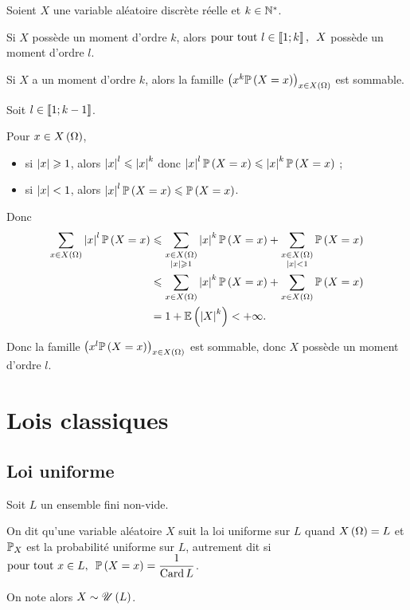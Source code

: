 \begin{prop}
Soient \(X\) une variable aléatoire discrète réelle et \(k\in\mathbb{N}^*\).

Si \(X\) possède un moment d'ordre \(k\), alors \(\quantifs{\tpt l\in\interventierii{1}{k}}X\) possède un moment d'ordre \(l\).
\end{prop}

\begin{dem}
Si \(X\) a un moment d'ordre \(k\), alors la famille \(\left(x^k\mathbb{P}\left(X=x\right)\right)_{x\in X\left(\Omega\right)}\) est sommable.

Soit \(l\in\left\llbracket1;k-1\right\rrbracket\).

Pour \(x\in X\left(\Omega\right)\), \begin{itemize}
    \item si \(\left\lvert x\right\rvert\geqslant1\), alors \(\left\lvert x\right\rvert^l\leqslant\left\lvert x\right\rvert^k\) donc \(\left\lvert x\right\rvert^l\mathbb{P}\left(X=x\right)\leqslant\left\lvert x\right\rvert^k\mathbb{P}\left(X=x\right)\) ; \\
    \item si \(\left\lvert x\right\rvert<1\), alors \(\left\lvert x\right\rvert^l\mathbb{P}\left(X=x\right)\leqslant\mathbb{P}\left(X=x\right)\). \\
\end{itemize}

Donc \[\begin{aligned}
\sum_{x\in X\left(\Omega\right)}\left\lvert x\right\rvert^l\mathbb{P}\left(X=x\right)&\leqslant\sum_{\substack{x\in X\left(\Omega\right) \\ \left\lvert x\right\rvert\geqslant1}}\left\lvert x\right\rvert^k\mathbb{P}\left(X=x\right)+\sum_{\substack{x\in X\left(\Omega\right) \\ \left\lvert x\right\rvert<1}}\mathbb{P}\left(X=x\right) \\
&\leqslant\sum_{x\in X\left(\Omega\right)}\left\lvert x\right\rvert^k\mathbb{P}\left(X=x\right)+\sum_{x\in X\left(\Omega\right)}\mathbb{P}\left(X=x\right) \\
&=1+\operatorname{\mathbb{E}}\left(\left\lvert X\right\rvert^k\right)<+\infty.
\end{aligned}\]

Donc la famille \(\left(x^l\mathbb{P}\left(X=x\right)\right)_{x\in X\left(\Omega\right)}\) est sommable, donc \(X\) possède un moment d'ordre \(l\).
\end{dem}

\section{Lois classiques}

\subsection{Loi uniforme}

\begin{defi}
Soit \(L\) un ensemble fini non-vide.

On dit qu'une variable aléatoire \(X\) suit la loi uniforme sur \(L\) quand \(X\left(\Omega\right)=L\) et \(\mathbb{P}_X\) est la probabilité uniforme sur \(L\), autrement dit si \(\quantifs{\tpt x\in L}\proba{X=x}=\dfrac{1}{\Card L}\).

On note alors \(X\sim\mathscr{U}\left(L\right)\).
\end{defi}

